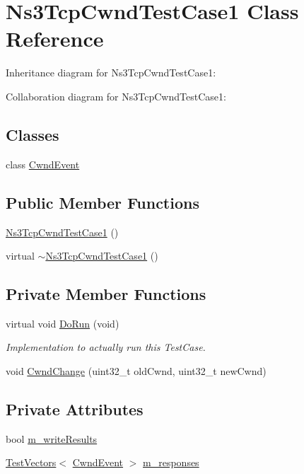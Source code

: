 \hypertarget{classNs3TcpCwndTestCase1}{}\section{Ns3\+Tcp\+Cwnd\+Test\+Case1 Class Reference}
\label{classNs3TcpCwndTestCase1}


Inheritance diagram for Ns3\+Tcp\+Cwnd\+Test\+Case1\+:


Collaboration diagram for Ns3\+Tcp\+Cwnd\+Test\+Case1\+:
\subsection*{Classes}
\begin{DoxyCompactItemize}
\item 
class \hyperlink{classNs3TcpCwndTestCase1_1_1CwndEvent}{Cwnd\+Event}
\end{DoxyCompactItemize}
\subsection*{Public Member Functions}
\begin{DoxyCompactItemize}
\item 
\hyperlink{classNs3TcpCwndTestCase1_a6858c45485b80e6326d02849facee4e2}{Ns3\+Tcp\+Cwnd\+Test\+Case1} ()
\item 
virtual \hyperlink{classNs3TcpCwndTestCase1_ab16ef4fc6c72a02dbe86d6e850ef5871}{$\sim$\+Ns3\+Tcp\+Cwnd\+Test\+Case1} ()
\end{DoxyCompactItemize}
\subsection*{Private Member Functions}
\begin{DoxyCompactItemize}
\item 
virtual void \hyperlink{classNs3TcpCwndTestCase1_a971429fc73e54e438db863df0cdf8647}{Do\+Run} (void)
\begin{DoxyCompactList}\small\item\em Implementation to actually run this Test\+Case. \end{DoxyCompactList}\item 
void \hyperlink{classNs3TcpCwndTestCase1_a78d0fac3fbeca9c5d14637f3233d26e7}{Cwnd\+Change} (uint32\+\_\+t old\+Cwnd, uint32\+\_\+t new\+Cwnd)
\end{DoxyCompactItemize}
\subsection*{Private Attributes}
\begin{DoxyCompactItemize}
\item 
bool \hyperlink{classNs3TcpCwndTestCase1_a190399add30bd33923dcd99ef55ec603}{m\+\_\+write\+Results}
\item 
\hyperlink{classns3_1_1TestVectors}{Test\+Vectors}$<$ \hyperlink{classNs3TcpCwndTestCase1_1_1CwndEvent}{Cwnd\+Event} $>$ \hyperlink{classNs3TcpCwndTestCase1_af29c36f15173cf8f986304e2a593f021}{m\+\_\+responses}
\end{DoxyCompactItemize}
